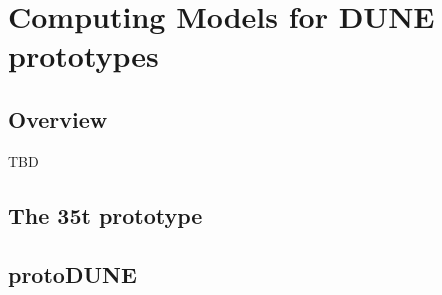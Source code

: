 \section{Computing Models for DUNE prototypes}
\subsection{Overview}
TBD
\subsection{The 35t prototype}

\newpage
\subsection{protoDUNE}



\newpage



